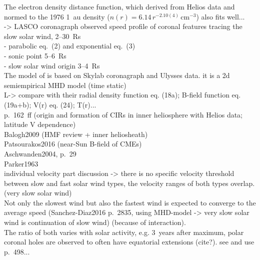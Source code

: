 The electron density distance function, which \citet{Bougeret1984} derived from Helios data and normed to the 1976 1~au density ($n(r) = 6.14\,r^{-2.10(4)}\,\text{cm}^{-3}$) also fits well...\\


\citet{Sheeley1997} -> LASCO coronagraph observed speed profile of coronal features tracing the slow solar wind, 2--30~Rs\\
- parabolic eq.~(2) and exponential eq.~(3)\\
- sonic point 5--6~Rs\\
- slow solar wind origin 3--4~Rs\\

The model of \citet{Sittler1999} is based on Skylab coronagraph and Ulysses data. it is a 2d semiempirical MHD model (time static)\\
L-> compare with their radial density function eq. (18a); B-field function eq. (19a+b); V(r) eq. (24); T(r)...\\

\citet{Balogh1999} p.~162~ff (origin and formation of CIRs in inner heliosphere with Helios data; latitude V dependence)\\
Balogh2009 (HMF review + inner heliosheath)\\
Patsourakos2016 (near-Sun B-field of CMEs)\\
Aschwanden2004, p.~29\\

Parker1963\\

individual velocity part discussion -> there is no specific velocity threshold between slow and fast solar wind types, the velocity ranges of both types overlap.\\
\citet{Sanchez-Diaz2016} (very slow solar wind)\\
Not only the slowest wind but also the fastest wind is expected to converge to the average speed (Sanchez-Diaz2016 p.~2835, using MHD-model -> very slow solar wind is continuation of slow wind) (because of interaction).\\

The ratio of both varies with solar activity, e.g. 3~years after maximum, polar coronal holes are observed to often have equatorial extensions (cite?). see and use \citet{Bougeret1984} p.~498...\\

